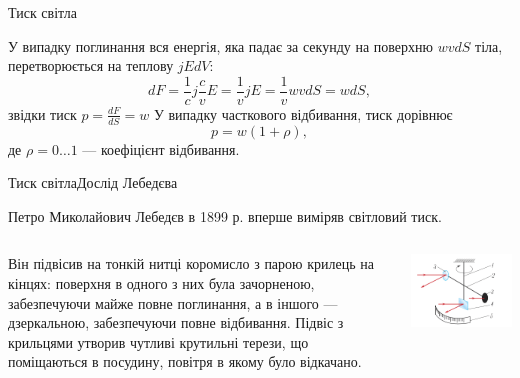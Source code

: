 \documentclass[onlytextwidth]{beamer}
\begin{document}
\begin{frame}{Тиск світла}{}
\begin{block}{}
\begin{overprint}
					У випадку поглинання вся енергія, яка падає за секунду на поверхню $wv dS$ тіла, перетворюється на теплову $ jE dV $:
					\begin{equation*}
						dF = \frac1c j \frac{c}{v}E = \frac1vjE = \frac1v wvdS = w dS,
					\end{equation*}
					звідки тиск $ p = \frac{dF}{dS} = w $
					\onslide<2>
					У випадку часткового відбивання, тиск дорівнює
					\begin{equation*}
						p = w (1 + \rho),
					\end{equation*}
					де $ \rho = 0 \ldots 1$ --- коефіцієнт відбивання.
				\end{overprint}
			\end{block}
\end{frame}

\begin{frame}{Тиск світла}{Дослід Лебедєва}\small
\begin{block}{}\justifying
    Петро Миколайович Лебедєв в 1899 р. вперше виміряв світловий тиск.
\end{block}
	\begin{columns}
		\begin{column}{0.6\linewidth}
            \begin{block}{}\justifying
			Він підвісив на тонкій нитці коромисло з парою крилець на кінцях:
			поверхня в одного з них була зачорненою, забезпечуючи майже повне поглинання, а в іншого --- дзеркальною, забезпечуючи повне відбивання.
			Підвіс з крильцями утворив чутливі крутильні терези, що поміщаються в посудину, повітря в якому було відкачано.
            \end{block}
		\end{column}
		\begin{column}{0.4\linewidth}\centering
			\includegraphics[width=\linewidth]{LebedevExp}
		\end{column}
	\end{columns}


\end{frame}
\end{document}
